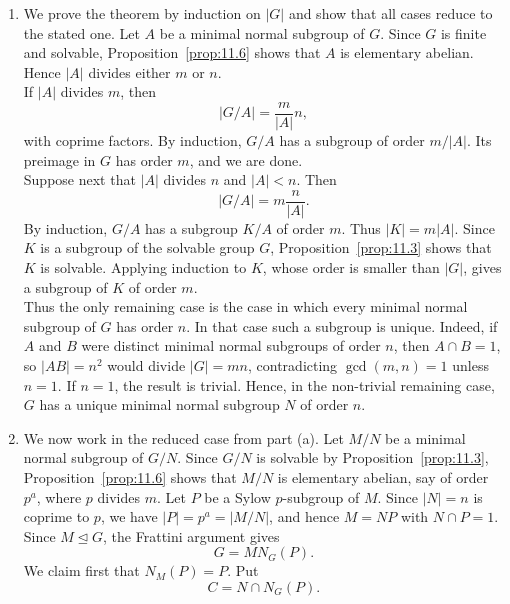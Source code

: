 \documentclass[../Odyssey_Project.tex]{subfiles}
\begin{document}
\begin{solution}
    \phantom{}\par
    \begin{enumerate}
        \item[(a)] We prove the theorem by induction on $\lvert G\rvert$ and show that all cases reduce to the stated one. Let $A$ be a minimal normal subgroup of $G$. Since $G$ is finite and solvable, Proposition~\ref{prop:11.6} shows that $A$ is elementary abelian. Hence $\lvert A\rvert$ divides either $m$ or $n$.\\
        If $\lvert A\rvert$ divides $m$, then
        \[
            \lvert G/A\rvert=\frac{m}{\lvert A\rvert}n,
        \]
        with coprime factors. By induction, $G/A$ has a subgroup of order $m/\lvert A\rvert$. Its preimage in $G$ has order $m$, and we are done.\\
        Suppose next that $\lvert A\rvert$ divides $n$ and $\lvert A\rvert<n$. Then
        \[
            \lvert G/A\rvert=m\frac{n}{\lvert A\rvert}.
        \]
        By induction, $G/A$ has a subgroup $K/A$ of order $m$. Thus $\lvert K\rvert=m\lvert A\rvert$. Since $K$ is a subgroup of the solvable group $G$, Proposition~\ref{prop:11.3} shows that $K$ is solvable. Applying induction to $K$, whose order is smaller than $\lvert G\rvert$, gives a subgroup of $K$ of order $m$.\\
        Thus the only remaining case is the case in which every minimal normal subgroup of $G$ has order $n$. In that case such a subgroup is unique. Indeed, if $A$ and $B$ were distinct minimal normal subgroups of order $n$, then $A\cap B=1$, so $\lvert AB\rvert=n^2$ would divide $\lvert G\rvert=mn$, contradicting $\gcd(m,n)=1$ unless $n=1$. If $n=1$, the result is trivial. Hence, in the non-trivial remaining case, $G$ has a unique minimal normal subgroup $N$ of order $n$.
        \item[(b)] We now work in the reduced case from part (a). Let $M/N$ be a minimal normal subgroup of $G/N$. Since $G/N$ is solvable by Proposition~\ref{prop:11.3}, Proposition~\ref{prop:11.6} shows that $M/N$ is elementary abelian, say of order $p^a$, where $p$ divides $m$. Let $P$ be a Sylow $p$-subgroup of $M$. Since $\lvert N\rvert=n$ is coprime to $p$, we have $\lvert P\rvert=p^a=\lvert M/N\rvert$, and hence $M=NP$ with $N\cap P=1$.\\
        Since $M\trianglelefteq G$, the Frattini argument gives
        \[
            G=MN_G(P).
        \]
        We claim first that $N_M(P)=P$. Put
        \[
            C=N\cap N_G(P).
\]
\end{enumerate}
\end{solution}
\end{document}
